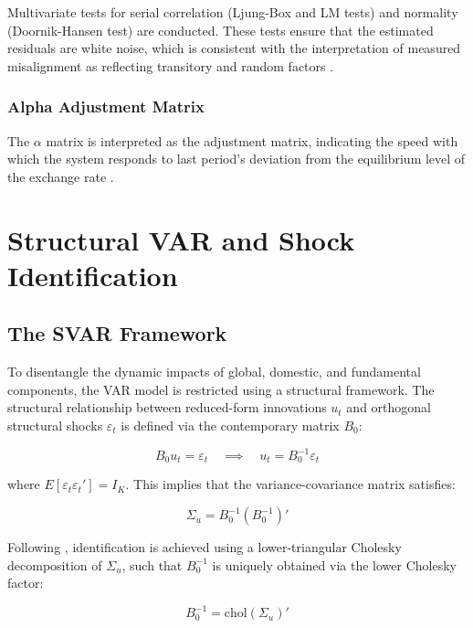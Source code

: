 \documentclass[11pt,a4paper]{article}
\begin{document}
Multivariate tests for serial correlation (Ljung-Box and LM tests) and normality (Doornik-Hansen test) are conducted. These tests ensure that the estimated residuals are white noise, which is consistent with the interpretation of measured misalignment as reflecting transitory and random factors \citep{ClarkMacDonald1998}.

\subsubsection{Alpha Adjustment Matrix}

The $\alpha$ matrix is interpreted as the adjustment matrix, indicating the speed with which the system responds to last period's deviation from the equilibrium level of the exchange rate \citep{Johansen1995, ClarkMacDonald1998}.

\section{Structural VAR and Shock Identification}

\subsection{The SVAR Framework}

To disentangle the dynamic impacts of global, domestic, and fundamental components, the VAR model is restricted using a structural framework. The structural relationship between reduced-form innovations $u_t$ and orthogonal structural shocks $\varepsilon_t$ is defined via the contemporary matrix $B_0$:

\begin{equation}
B_0 u_t = \varepsilon_t \quad \implies \quad u_t = B_0^{-1} \varepsilon_t
\label{eq:svar_relationship}
\end{equation}

where $E[\varepsilon_t \varepsilon_t'] = I_K$. This implies that the variance-covariance matrix satisfies:

\begin{equation}
\Sigma_u = B_0^{-1} (B_0^{-1})'
\label{eq:sigma_relationship}
\end{equation}

Following \cite{Sims1980}, identification is achieved using a lower-triangular Cholesky decomposition of $\Sigma_u$, such that $B_0^{-1}$ is uniquely obtained via the lower Cholesky factor:

\begin{equation}
B_0^{-1} = \text{chol}(\Sigma_u)'
\label{eq:cholesky}
\end{equation}
\end{document}
